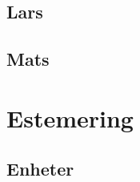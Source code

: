 \documentclass[12pt]{article}
\begin{document}
    \subsection{Lars}

    \subsection{Mats}

\section{Estemering}

    \subsection{Enheter}
\end{document}
